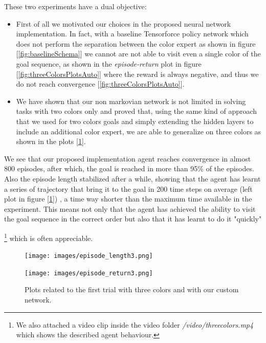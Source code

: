\documentclass{article}
\begin{document}
These two experiments have a dual objective:
\begin{itemize}
    \item First of all we motivated our choices in the proposed neural network implementation. In fact, with a baseline Tensorforce policy network which does not perform the separation between the color expert as shown in figure [\ref{fig:baselineSchema}] we cannot are not able to visit even a single color of the goal sequence, as shown in the \textit{episode-return} plot in figure [\ref{fig:threeColorsPlotsAuto}] where the reward is always negative, and thus we do not reach convergence  [\ref{fig:threeColorsPlotsAuto}].
    \item We have shown that our non markovian network is not limited in solving tasks with two colors only and proved that, using the same kind of approach that we used for two colors goals and simply extending the hidden layers to include an additional color expert, we are able to generalize on three colors as shown in the plots [\ref{fig:threeColorsPlotsCustom}].
\end{itemize}

We see that our proposed implementation agent reaches convergence in almost 800 episodes, after which, the goal is reached in more than 95\% of the episodes. Also the episode length stabilized after a while, showing that the agent has learnt a series of trajectory that bring it to the goal in 200 time steps on average (left plot in figure [\ref{fig:threeColorsPlotsCustom}]) , a time way shorter than the maximum time available in the experiment. This means not only that the agent has achieved the ability to visit the goal sequence in the correct order but also that it has learnt to do it "quickly"

\footnote{We also attached a video clip inside the video folder \textit{/video/three\textunderscore colors.mp4} which shows the described agent behaviour.}
which is often appreciable. \\







\begin{figure}[H]
  \centering
  \begin{minipage}[b]{0.45\textwidth}
    \texttt{[image: images/episode\_length3.png]}
  \end{minipage}
  \hfill
  \begin{minipage}[b]{0.45\textwidth}
    \texttt{[image: images/episode\_return3.png]}
  \end{minipage}
  \caption{Plots related to the first trial with three colors and with our custom network.}
  \label{fig:threeColorsPlotsCustom}
\end{figure}
\end{document}
